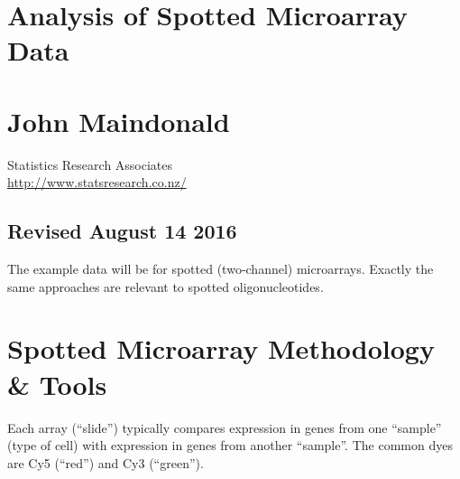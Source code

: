 \documentclass[a4paper,9pt]{article}\usepackage[]{graphicx}\usepackage[]{color}
\begin{document}
\begin{center}
\section*{\LARGE \bf Analysis of Spotted  Microarray Data}

\section*{John Maindonald}
Statistics Research Associates\\
\url{http://www.statsresearch.co.nz/}

\subsection*{Revised August 14 2016}
\end{center}
\vspace*{0.5cm}

The example data will be for spotted (two-channel) microarrays.  Exactly the same approaches are relevant to spotted 
oligonucleotides.

\section{Spotted Microarray Methodology \& Tools}
Each array (``slide'') typically compares expression in genes from one ``sample'' (type of cell) with expression in genes from another
``sample''. The common dyes are Cy5 (``red'') and Cy3 (``green'').
\end{document}
